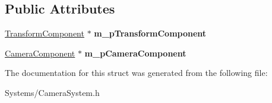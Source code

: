 \subsection*{Public Attributes}
\begin{DoxyCompactItemize}
\item 
\mbox{\label{structCameraCompNode_a535902ba2bbef6190b4804952a623ee7}} 
\hyperlink{classTransformComponent}{Transform\+Component} $\ast$ {\bfseries m\+\_\+p\+Transform\+Component}
\item 
\mbox{\label{structCameraCompNode_ac45f3d84854086865468b82ea4df8c4d}} 
\hyperlink{classCameraComponent}{Camera\+Component} $\ast$ {\bfseries m\+\_\+p\+Camera\+Component}
\end{DoxyCompactItemize}


The documentation for this struct was generated from the following file\+:\begin{DoxyCompactItemize}
\item 
Systems/Camera\+System.\+h\end{DoxyCompactItemize}
